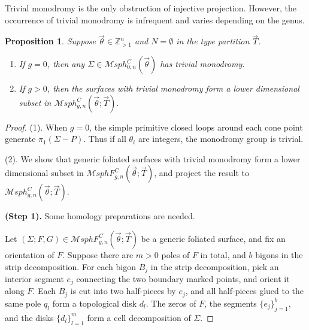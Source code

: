 \documentclass[pdflatex,sn-mathphys]{sn-jnl}%
\numberwithin{equation}{section}
\theoremstyle{thmstyleone}%
\newtheorem{proposition}[theorem]{Proposition}%
\newcommand{\ZZ}{\mathbb{Z}}
\newcommand{\MsphC}[3]{\mathcal{M}sph^C_{#1,#2}(#3)}
\newcommand{\MsphgnCT}{\mathcal{M}sph_{g,n}^C(\vec{\theta};\vec{T})}
\newcommand{\MsphgnCFT}{\mathcal{M}sphF_{g,n}^C(\vec{\theta};\vec{T})}
\begin{document}
Trivial monodromy is the only obstruction of injective projection. However, the occurrence of trivial monodromy is infrequent and varies depending on the genus.
\begin{proposition}\label{prop:trivial_mono}
    Suppose $\vec{\theta}\in\ZZ_{>1}^n$ and $N=\emptyset$ in the type partition $\vec{T}$.
    \begin{enumerate}

        \item If $g=0$, then any $\Sigma\in \MsphC{0}{n}{\vec{\theta}}$ has trivial monodromy.
        \item If $g>0$, then the surfaces with trivial monodromy form a lower dimensional subset in $\MsphgnCT$.
    \end{enumerate}
\end{proposition}
\begin{proof}
    (1). When $g=0$, the simple primitive closed loops around each cone point generate $\pi_1(\Sigma-P)$. Thus if all $\theta_i$ are integers, the monodromy group is trivial.

    \medskip
    (2). We show that generic foliated surfaces with trivial monodromy form a lower dimensional subset in $\MsphgnCFT$, and project the result to $\MsphgnCT$.

    \textbf{(Step 1).} Some homology preparations are needed.

    Let $(\Sigma;F,G)\in\MsphgnCFT$ be a generic foliated surface, and fix an orientation of $F$. Suppose there are $m>0$ poles of $F$ in total, and $b$ bigons in the strip decomposition. For each bigon $B_j$ in the strip decomposition, pick an interior segment $e_j$ connecting the two boundary marked points, and orient it along $F$. Each $B_j$ is cut into two half-pieces by $e_j$, and all half-pieces glued to the same pole $q_l$ form a topological disk $d_l$. %
    The zeros of $F$, the segments $\{ e_j \}_{j=1}^{b}$, and the disks $\{d_l\}_{l=1}^{m}$ form a cell decomposition of $\Sigma$.


\end{proof}
\end{document}
